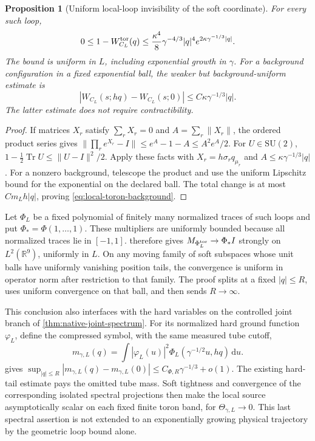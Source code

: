 \documentclass[11pt,oneside,openany]{book}
\newtheorem{proposition}[proposition]{Proposition}
\theoremstyle{definition}
\theoremstyle{remark}
\newcommand{\dd}{\mathrm d}
\newcommand{\SU}{\mathrm{SU}}
\begin{document}
\begin{proposition}[Uniform local-loop invisibility of the soft coordinate]
\label{prop:local-toron-loops}
For every such loop,
\begin{equation}
 0\le1-W^{\rm tor}_{C_L}(q)
 \le\frac{\kappa^4}{8}\gamma^{-4/3}|q|^4
             e^{2\kappa\gamma^{-1/3}|q|}.
 \label{eq:local-toron-loop-blindness}
\end{equation}
The bound is uniform in $L$, including exponential growth in
$\gamma$. For a background configuration in a fixed exponential
ball, the weaker but background-uniform estimate is
\begin{equation}
 |W_{C_L}(s;hq)-W_{C_L}(s;0)|
                    \le C\kappa\gamma^{-1/3}|q|.
 \label{eq:local-toron-background}
\end{equation}
The latter estimate does not require contractibility.
\end{proposition}
\begin{proof}
If matrices $X_r$ satisfy $\sum_rX_r=0$ and
$A=\sum_r\|X_r\|$, the ordered product series gives
$\|\prod_re^{X_r}-I\|\le e^A-1-A\le A^2e^A/2$.
For $U\in\SU(2)$,
$1-\tfrac12\operatorname{Tr}U\le\|U-I\|^2/2$.
Apply these facts with $X_r=h\sigma_rq_{\mu_r}$ and
$A\le\kappa\gamma^{-1/3}|q|$. For a nonzero background,
telescope the product and use the uniform Lipschitz bound for the
exponential on the declared ball. The total change is at most
$Cm_Lh|q|$, proving \cref{eq:local-toron-background}.
\end{proof}

Let $\Phi_L$ be a fixed polynomial of finitely many normalized
traces of such loops and put $\Phi_*=\Phi(1,\ldots,1)$.
These multipliers are uniformly bounded because all normalized
traces lie in $[-1,1]$.  therefore gives
$M_{\Phi_L^{\rm tor}}\to\Phi_*I$ strongly on $L^2(\mathbb R^9)$,
uniformly in $L$. On any moving family of soft subspaces whose unit
balls have uniformly vanishing position tails, the convergence is
uniform in operator norm after restriction to that family. The proof
splits at a fixed $|q|\le R$, uses uniform convergence on that ball,
and then sends $R\to\infty$.

This conclusion also interfaces with the hard variables on the
controlled joint branch of \cref{thm:native-joint-spectrum}. For
its normalized hard ground function $\varphi_L$, define the compressed
symbol, with the same measured tube cutoff,
\[
 m_{\gamma,L}(q)=\int |\varphi_L(u)|^2
                         \Phi_L(\gamma^{-1/2}u,hq)\,\dd u.
\]
 gives
$\sup_{|q|\le R}|m_{\gamma,L}(q)-m_{\gamma,L}(0)|
 \le C_{\Phi,R}\gamma^{-1/3}+o(1)$.
The existing hard-tail estimate pays the omitted tube mass. Soft
tightness and convergence of the corresponding isolated spectral
projections then make the local source asymptotically scalar on each
fixed finite toron band, for $\Theta_{\gamma,L}\to0$.
This last spectral assertion is not extended to an exponentially
growing physical trajectory by the geometric loop bound alone.
\end{document}
